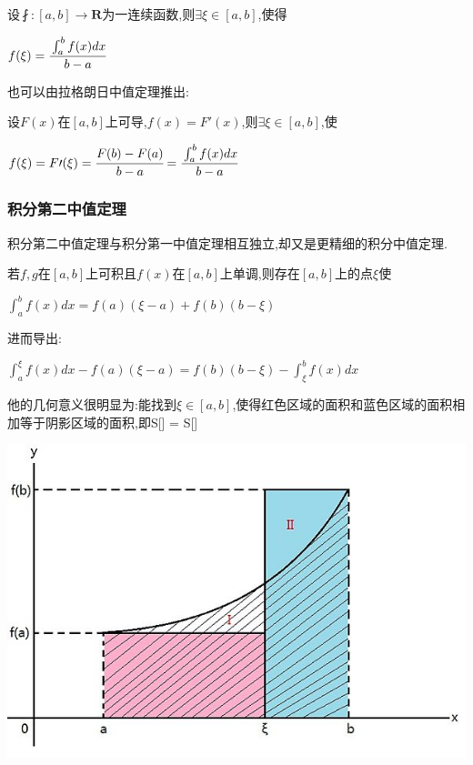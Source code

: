 \documentclass[UTF8,12pt]{ctexbook}
\newcommand{\defFunction}[1]{f(#1)}
\newcommand{\definiteIntegral}[2]{\int^{#1}_{#2}}
\begin{document}
{{{{设$\fint : [a,b] \to \mathbf{R}$为一连续函数,则$\exists\xi\in[a,b]$,使得

$\defFunction{\xi} = \cfrac{\definiteIntegral{b}{a}\defFunction{x}dx}{b - a}$

也可以由拉格朗日中值定理推出:

设$F(x)$在$[a,b]$上可导,$\defFunction{x} = F\prime(x)$,则$\exists\xi\in[a,b]$,使

$\defFunction{\xi} = F\prime(\xi) = \cfrac{F(b) - F(a)}{b - a} = \cfrac{\definiteIntegral{b}{a}\defFunction{x}dx}{b - a}$

}%

\subsubsection{积分第二中值定理}{

积分第二中值定理与积分第一中值定理相互独立,却又是更精细的积分中值定理.

若$f,g$在$[a,b]$上可积且$f(x)$在$[a,b]$上单调,则存在$[a,b]$上的点$\xi$使

$\definiteIntegral{b}{a}\defFunction{x}dx = \defFunction{a}(\xi - a) + \defFunction{b}(b - \xi)$

进而导出:

$\definiteIntegral{\xi}{a}\defFunction{x}dx -\defFunction{a}(\xi - a) = \defFunction{b}(b - \xi) - \definiteIntegral{b}{\xi}\defFunction{x}dx$

他的几何意义很明显为:能找到$\xi\in[a,b]$,使得红色区域的面积和蓝色区域的面积相加等于阴影区域的面积,即S[\uppercase\expandafter{}] = S[\uppercase\expandafter{}]

\begin{center}
  \includegraphics{resources/Geometric_explanation_of_the_second_mean_value_theorem_for_integration.jpg}
\end{center}

}}}}
\end{document}
